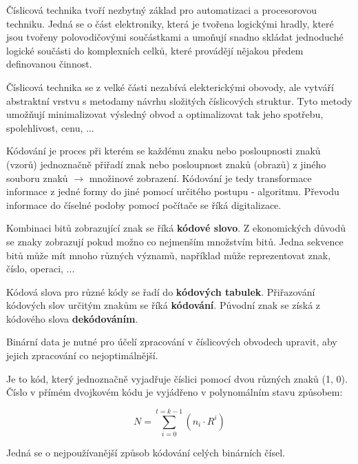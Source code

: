 
\Obsah


Číslicová technika tvoří nezbytný základ pro automatizaci a procesorovou techniku. Jedná se o část elektroniky, která je tvořena logickými hradly, které jsou tvořeny polovodičovými součástkami a umoňují snadno skládat jednoduché logické součásti do komplexních celků, které provádějí nějakou předem definovanou činnost. 

Číslicová technika se z velké části nezabívá elekterickými obovody, ale vytváří abstraktní vrstvu s metodamy návrhu složitých číslicových struktur. Tyto metody umožňují minimalizovat výsledný obvod a optimalizovat tak jeho spotřebu, spolehlivost, cenu, ... 


Kódování je proces při kterém se každému znaku nebo posloupnosti znaků (vzorů) jednoznačně přiřadí znak nebo posloupnost znaků (obrazů) z jiného souboru znaků $\rightarrow$ množinové zobrazení. Kódování je tedy transformace informace z jedné formy do jiné pomocí určitého postupu - algoritmu. Převodu informace do číselné podoby pomocí počítače se říká digitalizace.

Kombinaci bitů zobrazující znak se říká {\bf kódové slovo}. Z ekonomických důvodů se znaky zobrazují pokud možno co nejmenším množstvím bitů.
Jedna sekvence bitů může mít mnoho různých významů, například může reprezentovat znak, číslo, operaci, ...

Kódová slova pro různé kódy se řadí do {\bf kódových tabulek}. Přiřazování kódových slov určitým znakům se říká {\bf kódování}. Původní znak se získá z kódového slova {\bf dekódováním}.


Binární data je nutné pro účelí zpracování v číslicových obvodech upravit, aby jejich zpracování co nejoptimálnější. 


Je to kód, který jednoznačně vyjadřuje číslici pomocí dvou různých znaků (1, 0). Číslo v přímém dvojkovém kódu je vyjádřeno v polynomálním stavu způsobem:

$$ N = \sum_{i=0}^{t = k-1} (n_i \cdot R^i) $$

Jedná se o nejpoužívanější způsob kódování celých binárních čísel. 



